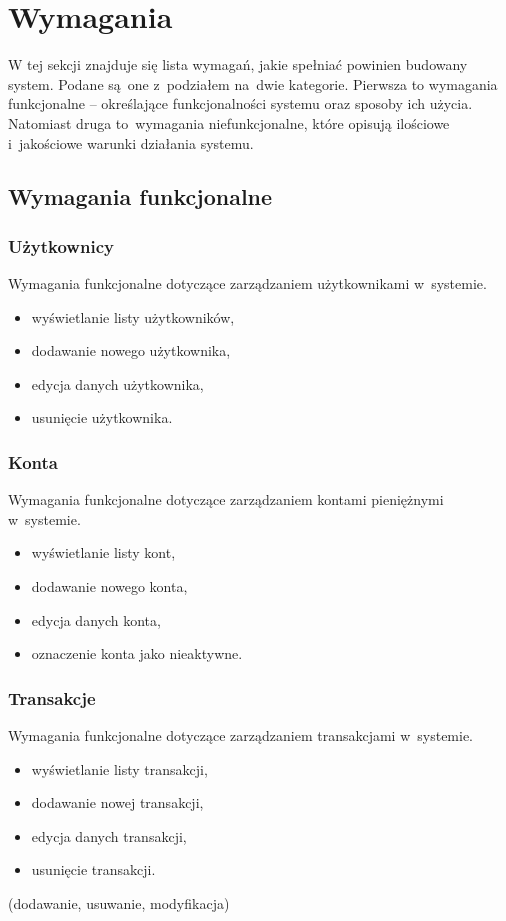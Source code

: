 \section{Wymagania}
W tej sekcji znajduje się lista wymagań, jakie spełniać powinien budowany system. Podane są~one z~podziałem na~dwie kategorie. Pierwsza to wymagania funkcjonalne -- określające funkcjonalności systemu oraz sposoby ich użycia. Natomiast druga to~wymagania niefunkcjonalne, które opisują ilościowe i~jakościowe warunki działania systemu.

\subsection{Wymagania funkcjonalne}
\subsubsection{Użytkownicy}
Wymagania funkcjonalne dotyczące zarządzaniem użytkownikami w~systemie.
\begin{itemize}
  \item wyświetlanie listy użytkowników,
  \item dodawanie nowego użytkownika,
  \item edycja danych użytkownika,
  \item usunięcie użytkownika.
\end{itemize}

\subsubsection{Konta}
Wymagania funkcjonalne dotyczące zarządzaniem kontami pieniężnymi w~systemie.
\begin{itemize}
  \item wyświetlanie listy kont,
  \item dodawanie nowego konta,
  \item edycja danych konta,
  \item oznaczenie konta jako nieaktywne.
\end{itemize}

\subsubsection{Transakcje}
Wymagania funkcjonalne dotyczące zarządzaniem transakcjami w~systemie.
\begin{itemize}
  \item wyświetlanie listy transakcji,
  \item dodawanie nowej transakcji,
  \item edycja danych transakcji,
  \item usunięcie transakcji.
\end{itemize}
(dodawanie, usuwanie, modyfikacja)

